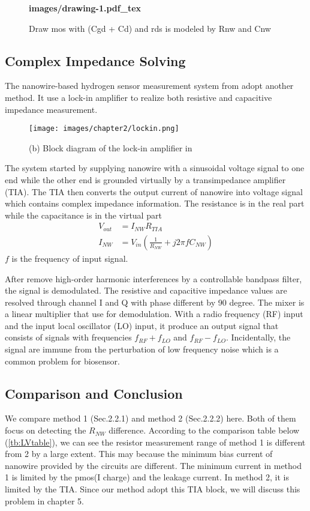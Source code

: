 \begin{figure}[!htbp]
    \centering
    {\selectfont\textbf{
        \def\svgwidth{5.0cm}
        \fontsize{6}{7}\selectfont
         {images/drawing-1.pdf_tex}
    }}
    \fontsize{6}{7}\selectfont
    \caption{Draw mos with (Cgd + Cd) and rds is modeled by Rnw and Cnw}
    \label{fig:tot_mos}
\end{figure}

\subsection{Complex Impedance Solving}
The nanowire-based hydrogen sensor measurement system from \cite{Jlockin} adopt another method.
It use a lock-in amplifier to realize both resistive and capacitive impedance measurement.

\begin{figure}[!htbp]
        \centering
        \texttt{[image: images/chapter2/lockin.png]}
        \caption{(b) Block diagram of the lock-in amplifier in \cite{Jlockin}}
        \label{fig:lockin}
\end{figure}

The system started by supplying nanowire with a sinusoidal voltage signal to one end while the other end is grounded virtually by a transimpedance amplifier (TIA).
The TIA then converts the output current of nanowire into voltage signal which contains complex impedance information.
The resistance is in the real part while the capacitance is in the virtual part
\setlength{\mathindent}{5.5cm}
\begin{align}
    V_{out} &= I_{NW}R_{TIA} \\
    I_{NW} &= V_{in}(\frac{1}{R_{NW}} + j 2\pi fC_{NW})
\end{align}
$f$ is the frequency of input signal.

After remove high-order harmonic interferences by a controllable bandpass filter, the signal is demodulated.
The resistive and capacitive impedance values are resolved through channel I and Q with phase different by 90 degree.
The mixer is a linear multiplier that use for demodulation.
With a radio frequency (RF) input and the input local oscillator (LO) input, it produce an output signal that consists of signals with frequencies $f_{RF} + f_{LO}$ and $f_{RF} - f_{LO}$.
Incidentally, the signal are immune from the perturbation of low frequency noise which is a common problem for biosensor.

\subsection{Comparison and Conclusion}
We compare method 1 (Sec.2.2.1) and method 2 (Sec.2.2.2) here.
Both of them focus on detecting the $R_{NW}$ difference.
According to the comparison table below (\ref{tb:LVtable}), we can see the resistor measurement range of method 1 is different from 2 by a large extent.
This may because the minimum bias current of nanowire provided by the circuits are different.
The minimum current in method 1 is limited by the pmos(I charge) and the leakage current.
In method 2, it is limited by the TIA.
Since our method adopt this TIA block, we will discuss this problem in chapter 5.

